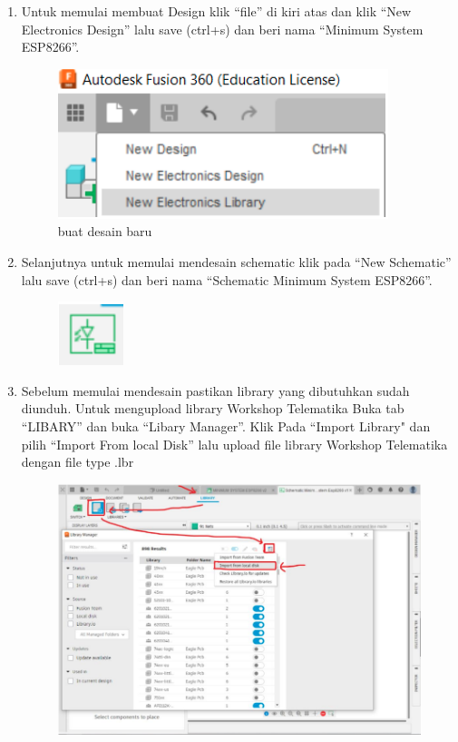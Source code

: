 \begin{enumerate}
    \item Untuk memulai membuat Design klik “file” di kiri atas dan klik “New Electronics Design”
    lalu save (ctrl+s) dan beri nama “Minimum System ESP8266”.
        \begin{figure}[H]
            \centering
            \includegraphics[width=0.6\linewidth]{P1/img/newelect.png}
            \caption{buat desain baru} 
            \label{fig:buat desain baru}
        \end{figure}
    \item Selanjutnya untuk memulai mendesain schematic klik pada “New Schematic” lalu
    save (ctrl+s) dan beri nama “Schematic Minimum System ESP8266”.
        \begin{figure}[H]
            \centering
            \includegraphics[width=0.16\linewidth]{P1/img/newschematic.png}
        \end{figure}
    \item Sebelum memulai mendesain pastikan library yang dibutuhkan sudah diunduh. Untuk
    mengupload library Workshop Telematika Buka tab “LIBARY” dan buka “Libary Manager”.
    Klik Pada “Import Library" dan pilih “Import From local Disk” lalu upload file library
    Workshop Telematika dengan file type .lbr
        \begin{figure}[H]
            \centering
            \includegraphics[width=0.7\linewidth]{P1/img/importLibrary.png}

\end{figure}
\end{enumerate}
